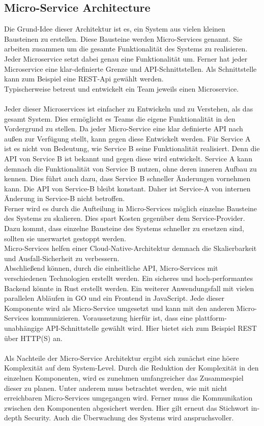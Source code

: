 \subsection{Micro-Service Architecture}
Die Grund-Idee dieser Architektur ist es, ein System aus vielen kleinen Bausteinen zu erstellen. Diese Bausteine werden Micro-Services genannt. Sie arbeiten zusammen um die gesamte Funktionalität des Systems zu realisieren. Jeder Microservice setzt dabei genau eine Funktionalität um. Ferner hat jeder Microservice eine klar-definierte Grenze und API-Schnittstellen. Als Schnittstelle kann zum Beispiel eine REST-Api gewählt werden.\\
Typischerweise betreut und entwickelt ein Team jeweils einen Microservice. \\\\
Jeder dieser Microservices ist einfacher zu Entwickeln und zu Verstehen, als das gesamt System. Dies ermöglicht es Teams die eigene Funktionalität in den Vordergrund zu stellen. Da jeder Micro-Service eine klar definierte API nach außen zur Verfügung stellt, kann gegen diese Entwickelt werden. Für Service A ist es nicht von Bedeutung, wie Service B seine Funktionalität realisiert. Denn die API von Service B ist bekannt und gegen diese wird entwickelt. Service A kann demnach die Funktionalität von Service B nutzen, ohne deren inneren Aufbau zu kennen. Dies führt auch dazu, dass Service B schneller Änderungen vornehmen kann. Die API von Service-B bleibt konstant. Daher ist Service-A von internen Änderung in Service-B nicht betroffen. \\
Ferner wird es durch die Aufteilung in Micro-Services möglich einzelne Bausteine des Systems zu skalieren. Dies spart Kosten gegenüber dem Service-Provider. Dazu kommt, dass einzelne Bausteine des Systems schneller zu ersetzen sind, sollten sie unerwartet gestoppt werden. \\
Micro-Services helfen einer Cloud-Native-Architektur demnach die Skalierbarkeit und Ausfall-Sicherheit zu verbessern.\\
Abschließend können, durch die einheitliche API, Micro-Services mit verschiedenen Technologien erstellt werden. Ein sicheres und hoch-performantes Backend könnte in Rust erstellt werden. Ein weiterer Anwendungsfall mit vielen parallelen Abläufen in GO und ein Frontend in JavaScript. Jede dieser Komponente wird als Micro-Service umgesetzt und kann mit den anderen Micro-Services kommunizieren. Voraussetzung hierfür ist, dass eine plattform-unabhängige API-Schnittstelle gewählt wird. Hier bietet sich zum Beispiel REST über HTTP(S) an.\\\\
Als Nachteile der Micro-Service Architektur ergibt sich zunächst eine höere Komplexität auf dem System-Level. Durch die Reduktion der Komplexität in den einzelnen Komponenten, wird es zunehmen umfangreicher das Zusammespiel dieser zu planen. Unter anderem muss betrachtet werden, wie mit nicht erreichbaren Micro-Services umgegangen wird. Ferner muss die Kommunikation zwischen den Komponenten abgesichert werden. Hier gilt erneut das Stichwort in-depth Security. Auch die Überwachung des Systems wird anspruchsvoller.

